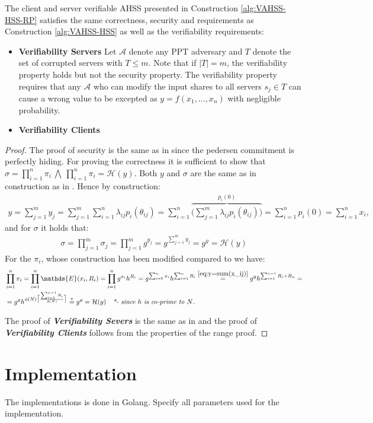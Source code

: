 \begin{thm}
\vspace{10pt}
The client and server verifiable AHSS presented in Construction \ref{alg:VAHSS-HSS-RP} satisfies the same correctness, security and requirements as Construction \ref{alg:VAHSS-HSS} as well as the verifiability requirements: 
\begin{itemize}
 \item \textbf{Verifiability Servers}  Let $\mathcal{A}$ denote any PPT  adversary and $T$ denote the set of corrupted servers with $T\leq m$. Note that if $|T|=m$, the verifiability property holds but not the security property. The verifiability property requires that any $\mathcal{A}$ who can modify the input shares to all servers $s_j\in T$ can cause a wrong value to be excepted as $y=f(x_1,...,x_n)$ with negligible probability.  
 \item  \textbf{Verifiability Clients} 
\end{itemize} 
\end{thm}
\begin{proof}
The proof of security is the same as in \cite{SumItUp} since the pedersen commitment is perfectly hiding. For proving the correctness it is sufficient to show that $\sigma= \prod_{i=1}^n \pi_i \:\bigwedge\: \prod_{i=1}^n \pi_i = \mathcal{H}(y)$. Both $y$ and $\sigma$ are the same as in construction as in \cite{VAHSS}. Hence by construction:
\begin{align}
    \label{eq:y=sum(x_ij)}
    y = \sum_{j=1}^m y_j= \sum_{j=1}^m \sum_{i=1}^n \lambda_{ij}p_i(\theta_{ij}) = \sum_{i=1}^n \overbrace{ \Big (\sum_{j=1}^m \lambda_{ij}p_i(\theta_{ij}) \Big)}^{ p_i(0)} = \sum_{i=1}^n p_i(0) = \sum_{i=1}^n x_i,
\end{align}
and for $\sigma$ it holds that:
\begin{align*}
    \sigma = \prod_{j=1}^m \sigma_j = \prod_{j=1}^m g^{y_j} = g^{\sum_{j=1}^my_j} =g^y = \mathcal{H}(y)
\end{align*}
For the $\pi_i$, whose construction has been modified compared to \cite{VAHSS} we have:
\begin{align*}
    &\prod_{i=1}^n \pi_i = \prod_{i=1}^n \mathds{E}(x_i,R_i)= \prod_{i=1}^n g^{x_i}h^{R_i} = g^{\sum_{i=1}^n x_i } h^{\sum_{i=1}^n R_i} \overset{\eqref{eq:y=sum(x_ij)}}{=} g^y h^{\sum_{i=1}^{n-1} R_i+R_n} = \\ 
    &= g^y h^{ \phi(N)\big\lceil \frac{\sum_{i=1}^{n-1}R_i}{\phi(N) }\big\rceil}  \overset{*}{=} g^y = \mathcal{H}(y) \quad \textit{*- since $h$ is co-prime to $N$.}
\end{align*}

The proof of \textit{\textbf{Verifiability Severs}} is the same as in \cite{SumItUp} and the proof of \textit{\textbf{Verifiability Clients}} follows from the properties of  the range proof.
\end{proof}

\section{Implementation}
The implementations is done in Golang. Specify all parameters used for the implementation. 